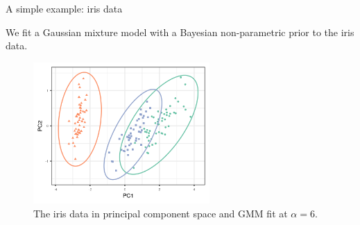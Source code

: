 \begin{frame}{A simple example: iris data}

We fit a Gaussian mixture model with a Bayesian non-parametric prior to
the iris data.

\begin{figure}[!h]
  \centering
  \includegraphics[width = 0.6\textwidth]{./figures/iris_init_fit.png}
  \caption*{The iris data in principal component space and GMM fit at $\alpha = 6$.}
\end{figure}

\end{frame}

